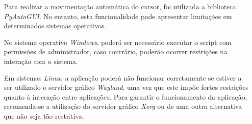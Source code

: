 Para realizar a movimentação automática do cursor, foi utilizada a biblioteca \textit{PyAutoGUI}. No entanto, esta funcionalidade pode apresentar limitações em determinados sistemas operativos.

No sistema operativo \textit{Windows}, poderá ser necessário executar o script com permissões de administrador, caso contrário, poderão ocorrer restrições na interação com o sistema.

Em sistemas \textit{Linux}, a aplicação poderá não funcionar corretamente se estiver a ser utilizado o servidor gráfico \textit{Wayland}, uma vez que este impõe fortes restrições quanto à interação entre aplicações. Para garantir o funcionamento da aplicação, recomenda-se a utilização do servidor gráfico \textit{Xorg} ou de uma outra alternativa que não seja tão restritiva.


